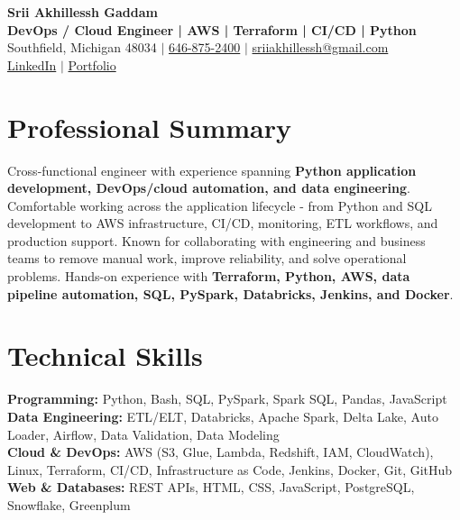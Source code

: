 \documentclass[letterpaper,10pt]{article}
\begin{document}
\fontsize{9.35pt}{10.45pt}\selectfont

\begin{center}
    {\LARGE \textbf{Srii Akhillessh Gaddam}} \\[-1pt]
    \textbf{DevOps / Cloud Engineer | AWS | Terraform | CI/CD | Python} \\[2pt]
    Southfield, Michigan 48034 $|$
    \href{tel:6468752400}{646-875-2400} $|$
    \href{mailto:sriiakhillessh@gmail.com}{sriiakhillessh@gmail.com} \\[1pt]
    \href{https://www.linkedin.com/in/srii-akhiilessh-gaddam-b48668191/}{LinkedIn} $|$
    \href{https://sriiakhillesshg.github.io/portfolio/}{Portfolio}
\end{center}
\vspace{-8pt}

\section{Professional Summary}
\small{Cross-functional engineer with experience spanning \textbf{Python application development, DevOps/cloud automation, and data engineering}. Comfortable working across the application lifecycle - from Python and SQL development to AWS infrastructure, CI/CD, monitoring, ETL workflows, and production support. Known for collaborating with engineering and business teams to remove manual work, improve reliability, and solve operational problems. Hands-on experience with \textbf{Terraform, Python, AWS, data pipeline automation, SQL, PySpark, Databricks, Jenkins, and Docker}.}

\section{Technical Skills}
\small{
\textbf{Programming:} Python, Bash, SQL, PySpark, Spark SQL, Pandas, JavaScript \\
\textbf{Data Engineering:} ETL/ELT, Databricks, Apache Spark, Delta Lake, Auto Loader, Airflow, Data Validation, Data Modeling \\
\textbf{Cloud \& DevOps:} AWS (S3, Glue, Lambda, Redshift, IAM, CloudWatch), Linux, Terraform, CI/CD, Infrastructure as Code, Jenkins, Docker, Git, GitHub \\
\textbf{Web \& Databases:} REST APIs, HTML, CSS, JavaScript, PostgreSQL, Snowflake, Greenplum
}
\end{document}
